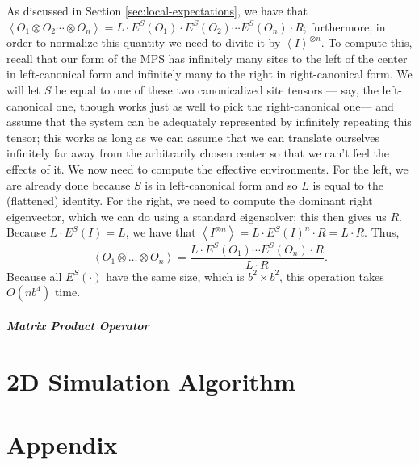 \documentclass{article}
\newcommand{\expect}[1]{\left<#1\right>}
\begin{document}
As discussed in Section \ref{sec:local-expectations}, we have that $\expect{O_1\otimes O_2\cdots\otimes O_n} = L\cdot E^S(O_1)\cdot E^S(O_2)\cdots E^S(O_n)\cdot R$; furthermore, in order to normalize this quantity we need to divite it by $\expect{I}^{\otimes n}$.  To compute this, recall that our form of the MPS has infinitely many sites to the left of the center in left-canonical form and infinitely many to the right in right-canonical form.  We will let $S$ be equal to one of these two canonicalized site tensors --- say, the left-canonical one, though works just as well to pick the right-canonical one--- and assume that the system can be adequately represented by infinitely repeating this tensor;  this works as long as we can assume that we can translate ourselves infinitely far away from the arbitrarily chosen center so that we can't feel the effects of it.  We now need to compute the effective environments.  For the left, we are already done because $S$ is in left-canonical form and so $L$ is equal to the (flattened) identity.  For the right, we need to compute the dominant right eigenvector, which we can do using a standard eigensolver;  this then gives us $R$.  Because $L\cdot E^S(I)=L$, we have that $\expect{I^{\otimes n}}=L\cdot E^S(I)^n\cdot R = L\cdot R$.  Thus,
$$\expect{O_1\otimes\dots\otimes O_n}=\frac{L\cdot E^S(O_1)\cdots E^S(O_n)\cdot R}{L\cdot R}.$$
Because all $E^S(\cdot)$ have the same size, which is $b^2\times b^2$, this operation takes $O(nb^4)$ time.

\subsubsection{Matrix Product Operator}

\part{2D Simulation Algorithm}
\label{2dsim}

\part{Appendix}
\end{document}
